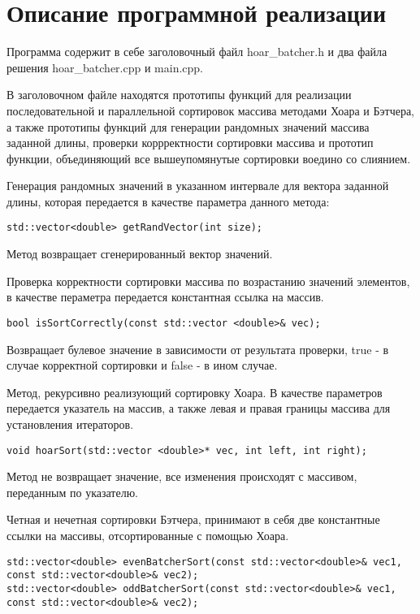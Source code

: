 \documentclass{report}
\begin{document}
\section*{Описание программной реализации}
Программа содержит в себе заголовочный файл hoar\_batcher.h и два файла решения hoar\_batcher.cpp и main.cpp.
\par В заголовочном файле находятся прототипы функций для реализации последовательной и параллельной сортировок массива методами Хоара и Бэтчера, а также прототипы функций для генерации рандомных значений массива заданной длины, проверки коррректности сортировки массива и прототип функции, объединяющий все вышеупомянутые сортировки воедино со слиянием.
\par Генерация рандомных значений в указанном интервале для вектора заданной длины, которая передается в качестве параметра данного метода:
\begin{lstlisting}
std::vector<double> getRandVector(int size);
\end{lstlisting}
\par Метод возвращает сгенерированный вектор значений.
\par Проверка корректности сортировки массива по возрастанию значений элементов, в качестве пераметра передается константная ссылка на массив.
\begin{lstlisting}
bool isSortCorrectly(const std::vector <double>& vec);
\end{lstlisting}
\par Возвращает булевое значение в зависимости от результата проверки, true - в случае корректной сортировки и false - в ином случае.
\par Метод, рекурсивно реализующий сортировку Хоара. В качестве параметров передается указатель на массив, а также левая и правая границы массива для установления итераторов.
\begin{lstlisting}
void hoarSort(std::vector <double>* vec, int left, int right);
\end{lstlisting}
\par Метод не возвращает значение, все изменения происходят с массивом, переданным по указателю.
\par Четная и нечетная сортировки Бэтчера, принимают в себя две константные ссылки на массивы, отсортированные с помощью Хоара.
\begin{lstlisting}
std::vector<double> evenBatcherSort(const std::vector<double>& vec1, const std::vector<double>& vec2);
std::vector<double> oddBatcherSort(const std::vector<double>& vec1, const std::vector<double>& vec2);
\end{lstlisting}
\end{document}
